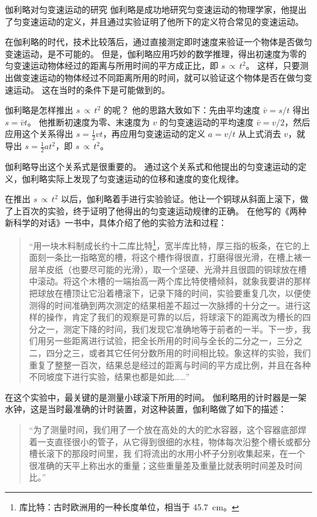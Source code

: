 \begin{Reading}{伽利略对匀变速运动的研究}
伽利略是成功地研究匀变速运动的物理学家，他提出了匀变速运动的定义，并且通过实验证明了他所下的定义符合常见的变速运动。

在伽利略的时代，技术比较落后，通过直接测定即时速度来验证一个物体是否做匀变速运动，是不可能的。
但是，伽利略应用巧妙的数学推理，得出初速度为零的匀变速运动物体经过的距离与所用时间的平方成正比，即 $s\, \propto\, t^2$。
这样，只要测出做变速运动的物体经过不同距离所用的时间，就可以验证这个物体是否在做匀变速运动。
这在当时的条件下是可能做到的。

伽利略是怎样推出 $s\, \propto\, t^2$ 的呢？
他的思路大致如下：先由平均速度 $\bar v=s/t$ 得出 $s=\bar v t$。
他推断初速度为零、末速度为 $v$ 的匀变速运动的平均速度 $\bar v=v/2$，然后应用这个关系得出 $s=\frac{1}{2}vt$，再应用匀变速运动的定义 $a=v/t$ 从上式消去 $v$，就导出 $s=\frac{1}{2}at^2$，即 $s\, \propto\, t^2$。

伽利略导出这个关系式是很重要的。
通过这个关系式和他提出的匀变速运动的定义，伽利略实际上发现了匀变速运动的位移和速度的变化规律。

在推出 $s\, \propto\, t^2$ 以后，伽利略着手进行实验验证。他让一个铜球从斜面上滚下，做了上百次的实验，终于证明了他得出的匀变速运动规律的正确。
在他写的《两种新科学的对话》一书中，具体介绍了他的实验方法和过程：

\begin{quotation}
    “用一块木料制成长约十二库比特\footnote{库比特：古时欧洲用的一种长度单位，相当于 \qty{45.7}{cm}。}，宽半库比特，厚三指的板条，在它的上面刻一条比一指略宽的槽，将这个槽作得很直，打磨得很光滑，在槽上裱一层羊皮纸（也要尽可能的光滑），取一个坚硬、光滑并且很圆的铜球放在槽中滚动。将这个木槽的一端抬高一两个库比特使槽倾斜，就象我要讲的那样把球放在槽顶让它沿着槽滚下，记录下降的时间，实验要重复几次，以便使测得的时间准确到两次测定的结果相差不超过一次脉搏的十分之一。进行这样的操作，肯定了我们的观察是可靠的以后，将球滚下的距离改为槽长的四分之一，测定下降的时间，我们发现它准确地等于前者的一半。下一步，我们用另一些距离进行试验，把全长所用的时间与全长的二分之一，三分之二，四分之三，或者其它任何分数所用的时间相比较。象这样的实验，我们重复了整整一百次，结果总是经过的距离与时间的平方成比例，并且在各种不同坡度下进行实验，结果也都是如此……”
\end{quotation}

在这个实验中，最关键的是测量小球滚下所用的时间。
伽利略用的计时器是一架水钟，这是当时最准确的计时装置，对这种装置，伽利略做了如下的描述：

\begin{quotation}
    “为了测量时间，我们用了一个放在高处的大的贮水容器，这个容器底部焊着一支直径很小的管子，从它得到很细的水柱，物体每次沿整个槽长或都分槽长滚下的那段时间里，我
们将流出的水用小杯子分别收集起来，在一个很准确的天平上称出水的重量；这些重量差及重量比就表明时间差及时间比。”
\end{quotation}


\end{Reading}
